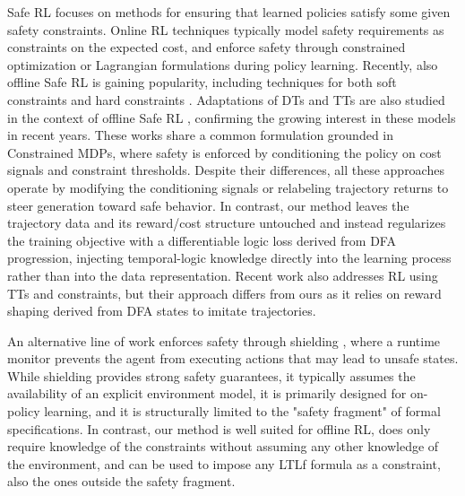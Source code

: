 Safe RL focuses on methods for ensuring that learned policies satisfy some given safety constraints. Online RL techniques \cite{achiam2017constrained,tessler2018reward} typically model safety requirements as constraints on the expected cost, and enforce safety through constrained optimization or Lagrangian formulations during policy learning. Recently, also offline Safe RL is gaining popularity, including techniques for both soft constraints \cite{xu2022constraints} and hard constraints \cite{zheng2024safe}. Adaptations of DTs and TTs are also studied in the context of offline Safe RL \cite{liu2023constrained,wang2024safe,guo2024temporal,zhang2023saformer}, confirming the growing interest in these models in recent years. These works share a common formulation grounded in Constrained MDPs, where safety is enforced by conditioning the policy on cost signals and constraint thresholds. Despite their differences, all these approaches operate by modifying the conditioning signals or relabeling trajectory returns to steer generation toward safe behavior. In contrast, our method leaves the trajectory data and its reward/cost structure untouched and instead regularizes the training objective with a differentiable logic loss derived from DFA progression, injecting temporal-logic knowledge directly into the learning process rather than into the data representation.
Recent work \cite{tian2023reinforcement} also addresses RL using TTs and \ltlf constraints, but their approach differs from ours as it relies on reward shaping derived from DFA states to imitate trajectories.


An alternative line of work enforces safety through shielding \cite{alshiekh2018safe,jansen2018safe,yang2023safe,belardinelli2025probabilistic}, where a runtime monitor prevents the agent from executing actions that may lead to unsafe states. 
While shielding provides strong safety guarantees, it typically assumes the availability of an explicit environment model, it is primarily designed for on-policy learning, and it is structurally limited to the "safety fragment" of formal specifications. In contrast, our method is well suited for offline RL, does only require knowledge of the constraints without assuming any other knowledge of the environment, and can be used to impose any LTLf formula as a constraint, also the ones outside the safety fragment. 

